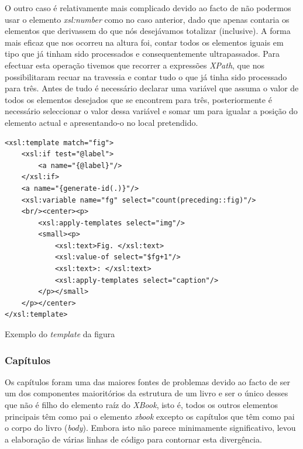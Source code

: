 \documentclass[a4paper]{article}
\begin{document}
\hspace{1cm}O outro caso é relativamente mais complicado devido ao facto de não podermos usar o elemento \emph{xsl:number} como no caso anterior, dado que apenas contaria os elementos que derivassem do que nós desejávamos totalizar (inclusive). A forma mais eficaz que nos ocorreu na altura foi, contar todos os elementos iguais em tipo que já tinham sido processados e consequentemente ultrapassados. Para efectuar esta operação tivemos que recorrer a expressões \emph{XPath}, que nos
possibilitaram recuar na travessia e contar tudo o que já tinha sido processado para três. Antes de tudo é necessário declarar uma variável que assuma o valor de todos os elementos desejados que se encontrem para três, posteriormente é necessário seleccionar o valor dessa variável e somar um para igualar a posição do elemento actual e apresentando-o no local pretendido.\\
         
\begin{small}                        
\begin{lstlisting}
<xsl:template match="fig">
    <xsl:if test="@label">
        <a name="{@label}"/>
    </xsl:if>
    <a name="{generate-id(.)}"/>
    <xsl:variable name="fg" select="count(preceding::fig)"/>
    <br/><center><p>
        <xsl:apply-templates select="img"/>
        <small><p>
            <xsl:text>Fig. </xsl:text>
            <xsl:value-of select="$fg+1"/>
            <xsl:text>: </xsl:text>
            <xsl:apply-templates select="caption"/>
        </p></small>
    </p></center>
</xsl:template>
\end{lstlisting}
\end{small}
\begin{footnotesize}
\begin{center}
\caption{Exemplo do \emph{template} da figura}
\end{center}
\end{footnotesize}

\subsubsection{Capítulos}

\hspace{1cm}Os capítulos foram uma das maiores fontes de problemas devido ao facto de ser um dos componentes maioritórios da estrutura de um livro e ser o único desses que não é filho do elemento raíz do \emph{XBook}, isto é, todos os outros elementos principais têm como pai o elemento \emph{xbook} excepto os capítulos que têm como pai o corpo do livro (\emph{body}). Embora isto não parece minimamente significativo, levou a elaboração de várias linhas de código para contornar esta divergência.
\end{document}
